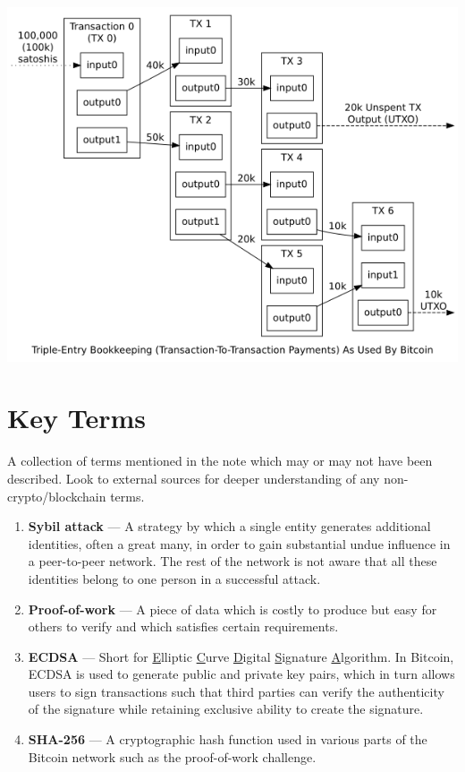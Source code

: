 \documentclass[11pt]{article}
\begin{document}
   \includegraphics[scale=0.9]{note2_transactions}
    
    
    \newpage
    \thispagestyle{firstpage}
    \vspace*{2\baselineskip}
    \section*{Key Terms}
    \noindent A collection of terms mentioned in the note which may or may not have been described. Look to external sources for deeper understanding of any non-crypto/blockchain terms.
    \begin{enumerate}
        \item \textbf{Sybil attack} --- A strategy by which a single entity generates additional identities, often a great many, in order to gain substantial undue influence in a peer-to-peer network. The rest of the network is not aware that all these identities belong to one person in a successful attack.
        \item \textbf{Proof-of-work} --- A piece of data which is costly to produce but easy for others to verify and which satisfies certain requirements. 
        \item \textbf{ECDSA} --- Short for \underline{E}lliptic \underline{C}urve \underline{D}igital \underline{S}ignature \underline{A}lgorithm. In Bitcoin, ECDSA is used to generate public and private key pairs, which in turn allows users to sign transactions such that third parties can verify the authenticity of the signature while retaining exclusive ability to create the signature.
        \item \textbf{SHA-256} --- A cryptographic hash function used in various parts of the Bitcoin network such as the proof-of-work challenge.
        
     
    \end{enumerate}
\end{document}
